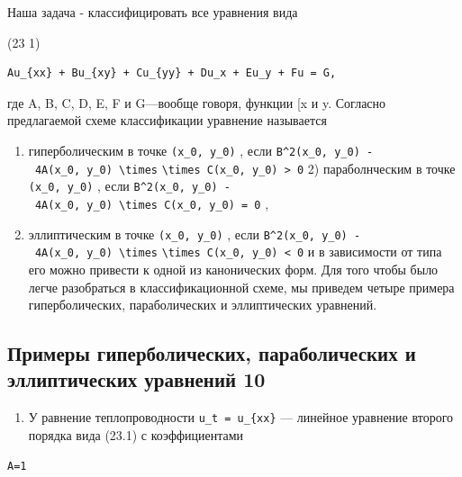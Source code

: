 \documentclass[
  ukrainian,
]{article}
\providecommand{\tightlist}{%
  \setlength{\itemsep}{0pt}\setlength{\parskip}{0pt}}
\begin{document}
Наша задача - классифицировать все уравнения вида

(23 1)

\begin{verbatim}
Au_{xx} + Bu_{xy} + Cu_{yy} + Du_x + Eu_y + Fu = G,
\end{verbatim}

где A, B, C, D, E, F и G---вообще говоря, функции {[}x и y. Согласно
предлагаемой схеме классификации уравнение называется

\begin{enumerate}
\def\labelenumi{\arabic{enumi})}
\item
  гиперболическим в точке \texttt{(x\_0,\ y\_0)} , если
  \texttt{B\^{}2(x\_0,\ y\_0)\ -\ 4A(x\_0,\ y\_0)\ \textbackslash{}times}
  \texttt{\textbackslash{}times\ C(x\_0,\ y\_0)\ \textgreater{}\ 0} 2)
  параболнческим в точке \texttt{(x\_0,\ y\_0)} , если
  \texttt{B\^{}2(x\_0,\ y\_0)\ -\ 4A(x\_0,\ y\_0)\ \textbackslash{}times\ C(x\_0,\ y\_0)\ =\ 0}
  ,
\item
  эллиптическим в точке \texttt{(x\_0,\ y\_0)} , если
  \texttt{B\^{}2(x\_0,\ y\_0)\ -\ 4A(x\_0,\ y\_0)\ \textbackslash{}times}
  \texttt{\textbackslash{}times\ C(x\_0,\ y\_0)\ \textless{}\ 0} и в
  зависимости от типа его можно привести к одной из канонических форм.
  Для того чтобы было легче разобраться в классификационной схеме, мы
  приведем четыре примера гиперболических, параболических и
  эллиптических уравнений.
\end{enumerate}

\subsection{Примеры гиперболических, параболических и эллиптических
уравнений
10}\label{ux43fux440ux438ux43cux435ux440ux44b-ux433ux438ux43fux435ux440ux431ux43eux43bux438ux447ux435ux441ux43aux438ux445-ux43fux430ux440ux430ux431ux43eux43bux438ux447ux435ux441ux43aux438ux445-ux438-ux44dux43bux43bux438ux43fux442ux438ux447ux435ux441ux43aux438ux445-ux443ux440ux430ux432ux43dux435ux43dux438ux439-10}

\begin{enumerate}
\def\labelenumi{\arabic{enumi}.}
\tightlist
\item
  У равнение теплопроводности \texttt{u\_t\ =\ u\_\{xx\}} --- линейное
  уравнение второго порядка вида (23.1) с коэффициентами
\end{enumerate}

\begin{verbatim}
A=1
\end{verbatim}
\end{document}
